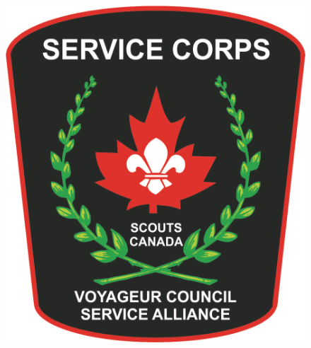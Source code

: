 \documentclass[letter, 11pt, oneside]{article}
\begin{document}
\begin{titlepage}
	\vspace*{5mm}
	{\LARGE \Title}
	\vspace*{5mm}
	\begin{figure}[H]
		\centering
		\includegraphics{res/badge2.png}
	\end{figure}
	
\end{titlepage}
\end{document}
